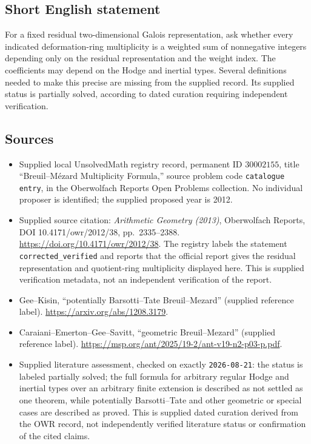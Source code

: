 \documentclass[11pt]{article}
\begin{document}
\subsection{Short English statement}
For a fixed residual two-dimensional Galois representation, ask whether every indicated deformation-ring multiplicity is a weighted sum of nonnegative integers depending only on the residual representation and the weight index. The coefficients may depend on the Hodge and inertial types. Several definitions needed to make this precise are missing from the supplied record. Its supplied status is partially solved, according to dated curation requiring independent verification.
\subsection{Sources}
\begin{itemize}
\item Supplied local UnsolvedMath registry record, permanent ID $30002155$, title ``Breuil--M\'ezard Multiplicity Formula,'' source problem code \texttt{catalogue entry}, in the Oberwolfach Reports Open Problems collection. No individual proposer is identified; the supplied proposed year is 2012.
\item Supplied source citation: \emph{Arithmetic Geometry (2013)}, Oberwolfach Reports, DOI 10.4171/owr/2012/38, pp.\ 2335--2388. \url{https://doi.org/10.4171/owr/2012/38}. The registry labels the statement \texttt{corrected\_verified} and reports that the official report gives the residual representation and quotient-ring multiplicity displayed here. This is supplied verification metadata, not an independent verification of the report.
\item Gee--Kisin, ``potentially Barsotti--Tate Breuil--Mezard'' (supplied reference label). \url{https://arxiv.org/abs/1208.3179}.
\item Caraiani--Emerton--Gee--Savitt, ``geometric Breuil--Mezard'' (supplied reference label). \url{https://msp.org/ant/2025/19-2/ant-v19-n2-p03-p.pdf}.
\item Supplied literature assessment, checked on exactly \texttt{2026-08-21}: the status is labeled partially solved; the full formula for arbitrary regular Hodge and inertial types over an arbitrary finite extension is described as not settled as one theorem, while potentially Barsotti--Tate and other geometric or special cases are described as proved. This is supplied dated curation derived from the OWR record, not independently verified literature status or confirmation of the cited claims.
\end{itemize}
\end{document}
